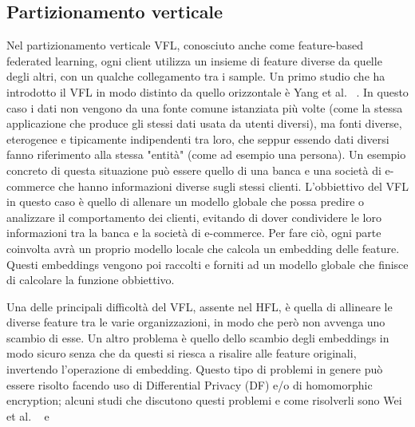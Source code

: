 \subsection{Partizionamento verticale}
Nel partizionamento verticale VFL, conosciuto anche come feature-based 
federated learning, ogni client utilizza un insieme 
di feature diverse da quelle degli altri, con un qualche collegamento 
tra i sample. Un primo studio che ha introdotto il VFL in modo distinto
da quello orizzontale è Yang et al. ~\cite{yang2019vfl}.
In questo caso i dati non vengono da una 
fonte comune istanziata più volte (come la stessa applicazione che 
produce gli stessi dati usata da utenti diversi), ma fonti diverse,
eterogenee e tipicamente indipendenti tra loro, che seppur essendo
dati diversi fanno riferimento alla stessa "entità" (come ad esempio
una persona). Un esempio concreto di questa situazione può essere 
quello di una banca e una società di e-commerce che hanno informazioni
diverse sugli stessi clienti. L'obbiettivo del VFL in questo caso è
quello di allenare un modello globale che possa predire o analizzare
il comportamento dei clienti, evitando di dover condividere le loro 
informazioni tra la banca e la società di e-commerce.
Per fare ciò, ogni parte coinvolta avrà un proprio modello locale che 
calcola un embedding delle feature. Questi embeddings vengono poi
raccolti e forniti ad un modello globale che finisce di calcolare la 
funzione obbiettivo.

Una delle principali difficoltà del VFL, assente nel HFL, è quella 
di allineare le diverse feature tra le varie organizzazioni, in 
modo che però non avvenga uno scambio di esse. Un altro problema è 
quello dello scambio degli embeddings in modo sicuro senza che da 
questi si riesca a risalire alle feature originali, invertendo
l'operazione di embedding. Questo tipo di problemi in genere può 
essere risolto facendo uso di Differential Privacy (DF) e/o di 
homomorphic encryption; alcuni studi che discutono questi problemi e
come risolverli sono Wei et al. ~\cite{wei2022vflChallenge} e 
~\cite{liu2022vflChallenge}


